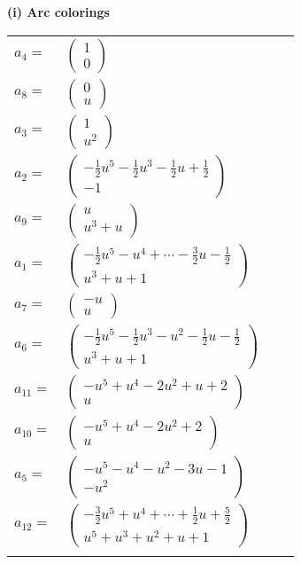 \documentclass[1p]{elsarticle_modified}
\theoremstyle{definition}
\begin{document}
\flushleft \textbf{(i) Arc colorings}\\
\begin{tabular}{m{7pt} m{180pt} m{7pt} m{180pt} }
\flushright $a_{4}=$&$\begin{pmatrix}1\\0\end{pmatrix}$ \\
\flushright $a_{8}=$&$\begin{pmatrix}0\\u\end{pmatrix}$ \\
\flushright $a_{3}=$&$\begin{pmatrix}1\\u^2\end{pmatrix}$ \\
\flushright $a_{2}=$&$\begin{pmatrix}-\frac{1}{2} u^5-\frac{1}{2} u^3-\frac{1}{2} u+\frac{1}{2}\\-1\end{pmatrix}$ \\
\flushright $a_{9}=$&$\begin{pmatrix}u\\u^3+u\end{pmatrix}$ \\
\flushright $a_{1}=$&$\begin{pmatrix}-\frac{1}{2} u^5- u^4+\cdots-\frac{3}{2} u-\frac{1}{2}\\u^3+u+1\end{pmatrix}$ \\
\flushright $a_{7}=$&$\begin{pmatrix}- u\\u\end{pmatrix}$ \\
\flushright $a_{6}=$&$\begin{pmatrix}-\frac{1}{2} u^5-\frac{1}{2} u^3- u^2-\frac{1}{2} u-\frac{1}{2}\\u^3+u+1\end{pmatrix}$ \\
\flushright $a_{11}=$&$\begin{pmatrix}- u^5+u^4-2 u^2+u+2\\u\end{pmatrix}$ \\
\flushright $a_{10}=$&$\begin{pmatrix}- u^5+u^4-2 u^2+2\\u\end{pmatrix}$ \\
\flushright $a_{5}=$&$\begin{pmatrix}- u^5- u^4- u^2-3 u-1\\- u^2\end{pmatrix}$ \\
\flushright $a_{12}=$&$\begin{pmatrix}-\frac{3}{2} u^5+u^4+\cdots+\frac{1}{2} u+\frac{5}{2}\\u^5+u^3+u^2+u+1\end{pmatrix}$\\&\end{tabular}
\end{document}
